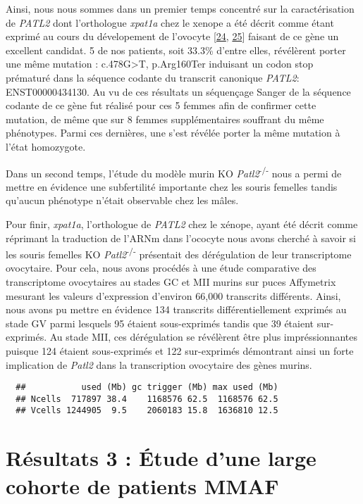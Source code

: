 \documentclass[12pt,twoside]{reedthesis}
\theoremstyle{definition}
\theoremstyle{definition}
\theoremstyle{remark}
\begin{document}
  Ainsi, nous nous sommes dans un premier temps concentré sur la
  caractérisation de \emph{PATL2} dont l'orthologue \emph{xpat1a} chez le
  xenope a été décrit comme étant exprimé au cours du dévelopement de
  l'ovocyte {[}\protect\hyperlink{ref-Marnef2010}{24},
  \protect\hyperlink{ref-Nakamura2010}{25}{]} faisant de ce gène un
  excellent candidat. 5 de nos patients, soit 33.3\% d'entre elles,
  révélèrent porter une même mutation : c.478G\textgreater{}T, p.Arg160Ter
  induisant un codon stop prématuré dans la séquence codante du transcrit
  canonique \emph{PATL2}: ENST00000434130. Au vu de ces résultats un
  séquençage Sanger de la séquence codante de ce gène fut réalisé pour ces
  5 femmes afin de confirmer cette mutation, de même que sur 8 femmes
  supplémentaires souffrant du même phénotypes. Parmi ces dernières, une
  s'est révélée porter la même mutation à l'état homozygote.
  
  Dans un second temps, l'étude du modèle murin KO
  \emph{Patl2}\textsuperscript{-/-} nous a permi de mettre en évidence une
  subfertilité importante chez les souris femelles tandis qu'aucun
  phénotype n'était observable chez les mâles.
  
  Pour finir, \emph{xpat1a}, l'orthologue de \emph{PATL2} chez le xénope,
  ayant été décrit comme réprimant la traduction de l'ARNm dans l'ococyte
  nous avons cherché à savoir si les souris femelles KO
  \emph{Patl2}\textsuperscript{-/-} présentait des dérégulation de leur
  transcriptome ovocytaire. Pour cela, nous avons procédés à une étude
  comparative des transcriptome ovocytaires au stades GC et MII murins sur
  puces Affymetrix mesurant les valeurs d'expression d'environ 66,000
  transcrits différents. Ainsi, nous avons pu mettre en évidence 134
  transcrits différentiellement exprimés au stade GV parmi lesquels 95
  étaient sous-exprimés tandis que 39 étaient sur-exprimés. Au stade MII,
  ces dérégulation se révélèrent être plus impréssionnantes puisque 124
  étaient sous-exprimés et 122 sur-exprimés démontrant ainsi un forte
  implication de \emph{Patl2} dans la transcription ovocytaire des gènes
  murins.
  
  \begin{verbatim}
  ##           used (Mb) gc trigger (Mb) max used (Mb)
  ## Ncells  717897 38.4    1168576 62.5  1168576 62.5
  ## Vcells 1244905  9.5    2060183 15.8  1636810 12.5
  \end{verbatim}
  
  \newpage  
  
  \section{Résultats 3 : Étude d'une large cohorte de patients
  MMAF}\label{resultats-3-etude-dune-large-cohorte-de-patients-mmaf}
  
\end{document}
